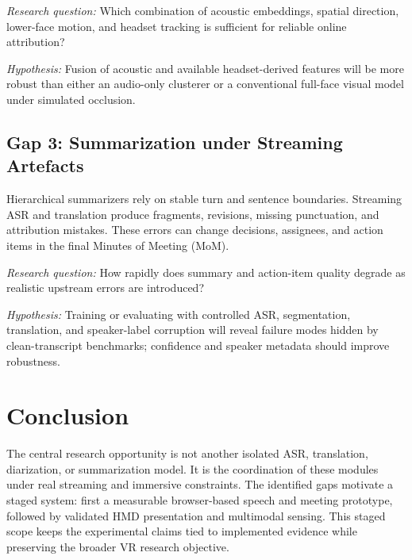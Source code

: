\documentclass[conference]{IEEEtran}
\begin{document}
\textit{Research question:} Which combination of acoustic embeddings, spatial direction, lower-face motion, and headset tracking is sufficient for reliable online attribution?

\textit{Hypothesis:} Fusion of acoustic and available headset-derived features will be more robust than either an audio-only clusterer or a conventional full-face visual model under simulated occlusion.

\subsection{Gap 3: Summarization under Streaming Artefacts}
Hierarchical summarizers rely on stable turn and sentence boundaries. Streaming ASR and translation produce fragments, revisions, missing punctuation, and attribution mistakes. These errors can change decisions, assignees, and action items in the final Minutes of Meeting (MoM).

\textit{Research question:} How rapidly does summary and action-item quality degrade as realistic upstream errors are introduced?

\textit{Hypothesis:} Training or evaluating with controlled ASR, segmentation, translation, and speaker-label corruption will reveal failure modes hidden by clean-transcript benchmarks; confidence and speaker metadata should improve robustness.

\section{Conclusion}
The central research opportunity is not another isolated ASR, translation, diarization, or summarization model. It is the coordination of these modules under real streaming and immersive constraints. The identified gaps motivate a staged system: first a measurable browser-based speech and meeting prototype, followed by validated HMD presentation and multimodal sensing. This staged scope keeps the experimental claims tied to implemented evidence while preserving the broader VR research objective.
\end{document}
